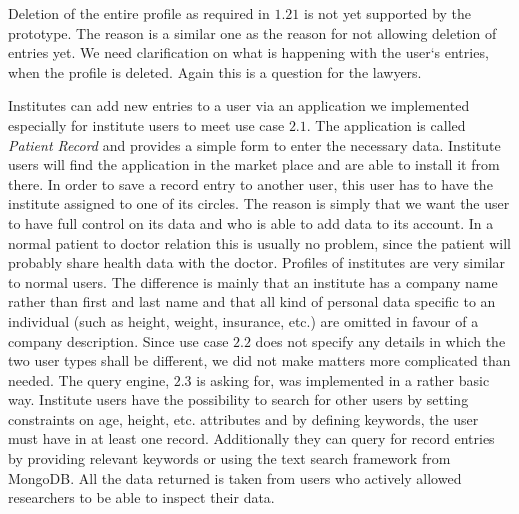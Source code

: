 Deletion of the entire profile as required in $1.21$ is not yet supported by the prototype. The reason is a similar one as the reason for not allowing deletion of entries yet. We need clarification on what is happening with the user`s entries, when the profile is deleted. Again this is a question for the lawyers. 

Institutes can add new entries to a user via an application we implemented especially for institute users to meet use case $2.1$. The application is called \emph{Patient Record} and provides a simple form to enter the necessary data. Institute users will find the application in the market place and are able to install it from there. In order to save a record entry to another user, this user has to have the institute assigned to one of its circles. The reason is simply that we want the user to have full control on its data and who is able to add data to its account. In a normal patient to doctor relation this is usually no problem, since the patient will probably share health data with the doctor.\newline
Profiles of institutes are very similar to normal users. The difference is mainly that an institute has a company name rather than first and last name and that all kind of personal data specific to an individual (such as height, weight, insurance, etc.) are omitted in favour of a company description. Since use case $2.2$ does not specify any details in which the two user types shall be different, we did not make matters more complicated than needed. \newline
The query engine, $2.3$ is asking for, was implemented in a rather basic way. Institute users have the possibility to search for other users by setting constraints on age, height, etc. attributes and by defining keywords, the user must have in at least one record. Additionally they can query for record entries by providing relevant keywords or using the text search framework from MongoDB. All the data returned is taken from users who actively allowed researchers to be able to inspect their data. 

